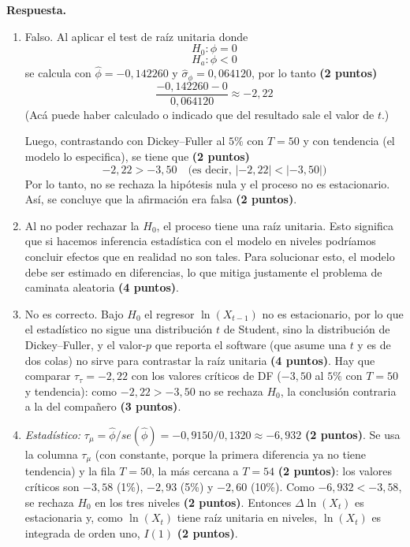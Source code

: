 \documentclass[12pt,letterpaper]{article}
\newcommand{\sol}{\color{blue}}
\begin{document}
\begin{enumerate}
{\sol
\textbf{Respuesta.}
\begin{enumerate}
    \item [a)] Falso. Al aplicar el test de raíz unitaria donde
    $$H_0: \phi = 0$$
    $$H_a: \phi < 0$$
    se calcula con $\hat{\phi} = -0{,}142260$ y $\hat{\sigma}_{\phi} = 0{,}064120$, por lo tanto \textbf{(2 puntos)}
    $$\frac{-0{,}142260 - 0}{0{,}064120} \approx -2{,}22$$
    (Acá puede haber calculado o indicado que del resultado sale el valor de $t$.)

    Luego, contrastando con Dickey--Fuller al $5\%$ con $T = 50$ y con tendencia (el modelo lo especifica), se tiene que \textbf{(2 puntos)}
    $$-2{,}22 > -3{,}50 \quad\text{(es decir, } |-2{,}22| < |-3{,}50|\text{)}$$
    Por lo tanto, no se rechaza la hipótesis nula y el proceso no es estacionario. Así, se concluye que la afirmación era falsa \textbf{(2 puntos)}.

    \item [b)] Al no poder rechazar la $H_0$, el proceso tiene una raíz unitaria. Esto significa que si hacemos inferencia estadística con el modelo en niveles podríamos concluir efectos que en realidad no son tales. Para solucionar esto, el modelo debe ser estimado en diferencias, lo que mitiga justamente el problema de caminata aleatoria \textbf{(4 puntos)}.

    \item [c)] No es correcto. Bajo $H_0$ el regresor $\ln(X_{t-1})$ no es estacionario, por lo que el estadístico no sigue una distribución $t$ de Student, sino la distribución de Dickey--Fuller, y el valor-$p$ que reporta el software (que asume una $t$ y es de dos colas) no sirve para contrastar la raíz unitaria \textbf{(4 puntos)}. Hay que comparar $\tau_\tau=-2{,}22$ con los valores críticos de DF ($-3{,}50$ al $5\%$ con $T=50$ y tendencia): como $-2{,}22>-3{,}50$ no se rechaza $H_0$, la conclusión contraria a la del compañero \textbf{(3 puntos)}.

    \item [d)] \textit{Estadístico:} $\tau_\mu=\hat\phi/se(\hat\phi)=-0{,}9150/0{,}1320\approx-6{,}932$ \textbf{(2 puntos)}. Se usa la columna $\tau_\mu$ (con constante, porque la primera diferencia ya no tiene tendencia) y la fila $T=50$, la más cercana a $T=54$ \textbf{(2 puntos)}: los valores críticos son $-3{,}58$ (1\%), $-2{,}93$ (5\%) y $-2{,}60$ (10\%). Como $-6{,}932<-3{,}58$, se rechaza $H_0$ en los tres niveles \textbf{(2 puntos)}. Entonces $\Delta\ln(X_t)$ es estacionaria y, como $\ln(X_t)$ tiene raíz unitaria en niveles, $\ln(X_t)$ es integrada de orden uno, $I(1)$ \textbf{(2 puntos)}.
\end{enumerate}}

\end{enumerate}
\end{document}
